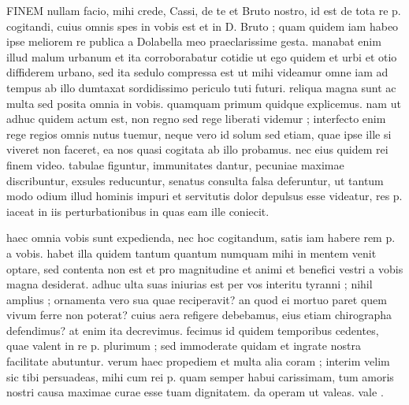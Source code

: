 


 FINEM nullam facio, mihi crede, Cassi, de te et Bruto nostro, id est de tota re p. cogitandi, cuius omnis spes in vobis est et in D. Bruto ; quam quidem iam habeo ipse meliorem re publica a Dolabella meo praeclarissime gesta. manabat enim illud malum urbanum et ita corroborabatur cotidie ut ego quidem et urbi et otio diffiderem urbano, sed ita sedulo compressa est ut mihi videamur omne iam ad tempus ab illo dumtaxat sordidissimo periculo tuti futuri. reliqua magna sunt ac multa sed posita omnia in vobis. quamquam primum quidque explicemus. nam ut adhuc quidem actum est, non regno sed rege liberati videmur ; interfecto enim rege regios omnis nutus tuemur, neque vero id solum sed etiam, quae ipse ille si viveret non faceret, ea nos quasi cogitata ab illo probamus. nec eius quidem rei finem video. tabulae figuntur, immunitates dantur, pecuniae maximae discribuntur, exsules reducuntur, senatus consulta falsa deferuntur, ut tantum modo odium illud hominis impuri et servitutis dolor depulsus esse videatur, res p. iaceat in iis perturbationibus in quas eam ille coniecit.

 haec omnia vobis sunt expedienda, nec hoc cogitandum, satis iam habere rem p. a vobis. habet illa quidem tantum quantum numquam mihi in mentem venit optare, sed contenta non est et pro magnitudine et animi et benefici vestri a vobis magna desiderat. adhuc ulta suas iniurias est per vos interitu tyranni ; nihil amplius ; ornamenta vero sua quae reciperavit? an quod ei mortuo paret quem vivum ferre non poterat? cuius aera refigere debebamus, eius etiam chirographa defendimus? at enim ita decrevimus. fecimus id quidem temporibus cedentes, quae valent in re p. plurimum ; sed immoderate quidam et ingrate nostra facilitate abutuntur. verum haec propediem et multa alia coram ; interim velim sic tibi persuadeas, mihi cum rei p. quam semper habui carissimam, tum amoris nostri causa maximae curae esse tuam dignitatem. da operam ut valeas. vale .

